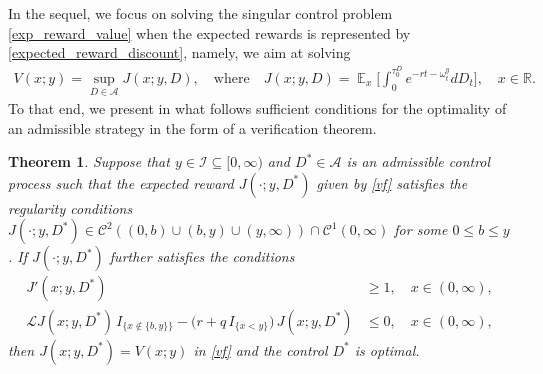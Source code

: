 \documentclass[11pt]{article} %
\newtheorem{theorem}{Theorem}
\def\R{\mathbb{R}}
\DeclareMathOperator{\E}{\mathbb E}
\numberwithin{komcounter}{section}
\numberwithin{equation}{section}
\numberwithin{theorem}{section}
\begin{document}
In the sequel, we focus on solving the singular control problem \eqref{exp_reward_value} when the expected rewards is represented by \eqref{expected_reward_discount}, 
namely, we aim at solving 
\begin{align}\label{vf}
V(x;y) = \sup_{D\in\mathcal{A}} J(x;y,D), \quad \text{where} \quad 
J(x;y,D) = \E_x\bigg[\int_0^{\tau^D_0}e^{-rt-\omega^y_t}dD_t\bigg],
\quad x \in \R.
\end{align}
To that end, we present in what follows sufficient conditions for the optimality of an admissible strategy in the form of a verification theorem.

\begin{theorem} \label{verification_theorem}
Suppose that $y \in \mathcal{I} \subseteq [0,\infty)$ 
and $D^*\in\mathcal{A}$ is an admissible control process such that the expected reward $J(\cdot;y,D^*)$ given by \eqref{vf} satisfies the regularity conditions $J(\cdot;y,D^*) \in \mathcal{C}^2((0,b) \cup (b,y) \cup (y,\infty)) \cap \mathcal{C}^1(0,\infty)$ for some $0 \leq b \leq y$. 
If $J(\cdot;y,D^*)$ further satisfies the conditions
\begin{align}
J'(x;y,D^*) &\geq 1, {\quad x\in (0,\infty),} \label{mainthmcond1}  \tag{I} \\
\mathcal{L} J(x;y,D^*) \, I_{\{x\not\in\{b,y\}\}} -\big(r + q \, I_{\{x<y\}} \big) \, J(x;y,D^*) &\leq 0, {\quad x\in (0,\infty),} \label{mainthmcond2} \tag{II}
\end{align}
then $J(x;y,D^*) = V(x;y)$ in \eqref{vf} and the control $D^*$ is optimal.
\end{theorem}
\end{document}
